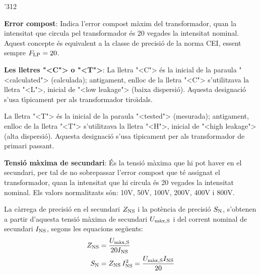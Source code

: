 \begin{dingautolist}{'312}
    \item \textbf{Error compost}: Indica l'error compost m\`{a}xim del
    transformador, quan la intensitat que circula pel
    transformador \'{e}s 20 vegades la intensitat nominal. Aquest concepte
     \'{e}s equivalent a la classe de precisi\'{o} de la norma \textsf{CEI},
     essent sempre $F_\mathrm{LP}=20$.
    \item \textbf{Les lletres {"<}C{">} o {"<}T{">}}: La lletra {"<}C{">} \'{e}s la inicial de la
    paraula  {"<}calculated{">} (calculada); antigament, enlloc de la lletra {"<}C{">}
    s'utilitzava la lletra {"<}L{">}, inicial de {"<}low leakage{">} (baixa
    dispersi\'{o}). Aquesta designaci\'{o} s'usa t\'{\i}picament per als
    transformador tiro\"{\i}dals.

    La lletra {"<}T{">} \'{e}s la inicial de la
    paraula  {"<}tested{">} (mesurada); antigament, enlloc de la lletra {"<}T{">}
    s'utilitzava la lletra {"<}H{">}, inicial de {"<}high leakage{">} (alta
    dispersi\'{o}). Aquesta designaci\'{o} s'usa t\'{\i}picament per als
    transformador de primari passant.
    \item \textbf{Tensi\'{o} m\`{a}xima de secundari}: \'{E}s la tensi\'{o} m\`{a}xima
    que hi pot haver en el secundari, per tal de no sobrepassar l'error compost que t\'{e}
    assignat el transformador, quan la intensitat que hi circula
     \'{e}s 20 vegades la intensitat nominal. Els valors
    normalitzats s\'{o}n: 10\unit{V}, 50\unit{V}, 100\unit{V}, 200\unit{V}, 400\unit{V} i 800\unit{V}.

    La c\`{a}rrega de precisi\'{o} en el secundari
    $Z_\mathrm{NS}$ i la pot\`{e}ncia de precisi\'{o} $S_\mathrm{N}$, s'obtenen a partir d'aquesta
    tensi\'{o} m\`{a}xima de secundari $U_\mathrm{m\grave{a}x,S}$
    i del corrent     nominal de secundari $I_\mathrm{NS}$, segons les equacions seg\"{u}ents:
    \begin{align}
        Z_\mathrm{NS} &= \frac{U_\mathrm{m\grave{a}x,S}}{20 I_\mathrm{NS}}\\
        S_\mathrm{N} &= Z_\mathrm{NS} \,I_\mathrm{NS}^2 = \frac{U_\mathrm{m\grave{a}x,S} I_\mathrm{NS}}{20}
        \label{eq:sn_ti_ansi}
    \end{align}
\end{dingautolist}

